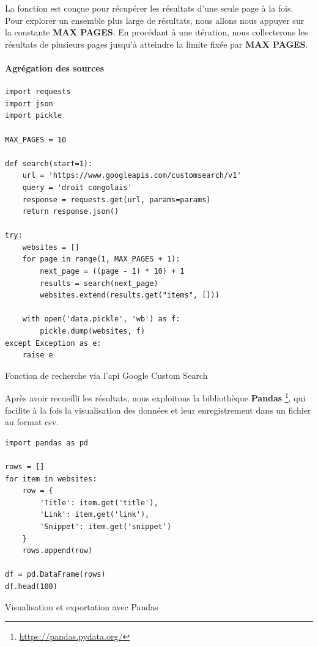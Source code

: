 La fonction est conçue pour récupérer les résultats d'une seule page à la fois. Pour explorer un ensemble plus large de résultats, nous allons nous appuyer sur la constante \textbf{MAX PAGES}. En procédant à une itération, nous collecterons les résultats de plusieurs pages jusqu'à atteindre la limite fixée par \textbf{MAX PAGES}.

\paragraph{Agrégation des sources} \hspace{0pt}

\begin{listing}[!ht]
\begin{verbatim}
import requests
import json
import pickle

MAX_PAGES = 10

def search(start=1):
    url = 'https://www.googleapis.com/customsearch/v1'
    query = 'droit congolais'
    response = requests.get(url, params=params)
    return response.json()

try:
    websites = []
    for page in range(1, MAX_PAGES + 1):
        next_page = ((page - 1) * 10) + 1
        results = search(next_page)
        websites.extend(results.get("items", []))

    with open('data.pickle', 'wb') as f:
        pickle.dump(websites, f)
except Exception as e:
    raise e
\end{verbatim}
\caption{Fonction de recherche via l'\acs{api} Google Custom Search}
\label{appendix:code:python:search-google-function}
\end{listing}

Après avoir recueilli les résultats, nous exploitons la bibliothèque \textbf{Pandas} \footnote{\href{https://pandas.pydata.org/}{https://pandas.pydata.org/}}, qui facilite à la fois la visualisation des données et leur enregistrement dans un fichier au format \ac{csv}.

\begin{listing}[!ht]
\begin{verbatim}
import pandas as pd 

rows = []
for item in websites:
    row = {
        'Title': item.get('title'),
        'Link': item.get('link'),
        'Snippet': item.get('snippet')
    }
    rows.append(row)

df = pd.DataFrame(rows)
df.head(100)
\end{verbatim}
\caption{Visualisation et exportation avec Pandas}
\label{appendix:code:python:search-google-visualization}
\end{listing}


